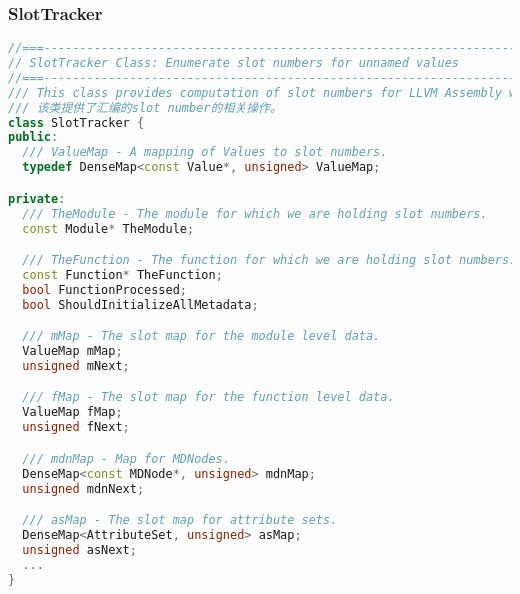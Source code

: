 \documentclass{ctexart}
\begin{document}
\subsubsection{SlotTracker}
\begin{lstlisting}[language=C++]
//===----------------------------------------------------------------------===//
// SlotTracker Class: Enumerate slot numbers for unnamed values
//===----------------------------------------------------------------------===//
/// This class provides computation of slot numbers for LLVM Assembly writing.
/// 该类提供了汇编的slot number的相关操作。
class SlotTracker {
public:
  /// ValueMap - A mapping of Values to slot numbers.
  typedef DenseMap<const Value*, unsigned> ValueMap;

private:
  /// TheModule - The module for which we are holding slot numbers.
  const Module* TheModule;

  /// TheFunction - The function for which we are holding slot numbers.
  const Function* TheFunction;
  bool FunctionProcessed;
  bool ShouldInitializeAllMetadata;

  /// mMap - The slot map for the module level data.
  ValueMap mMap;
  unsigned mNext;

  /// fMap - The slot map for the function level data.
  ValueMap fMap;
  unsigned fNext;

  /// mdnMap - Map for MDNodes.
  DenseMap<const MDNode*, unsigned> mdnMap;
  unsigned mdnNext;

  /// asMap - The slot map for attribute sets.
  DenseMap<AttributeSet, unsigned> asMap;
  unsigned asNext;
  ...
}
\end{lstlisting}
\end{document}
